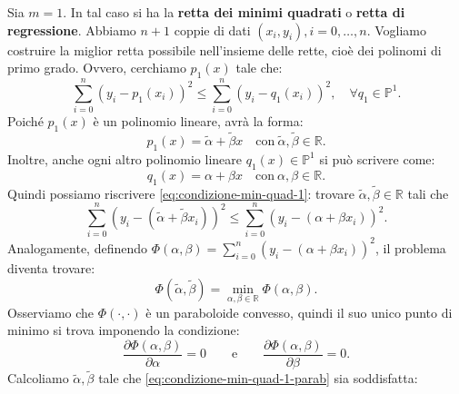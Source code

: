 Sia $m=1$. In tal caso si ha la \textbf{retta dei minimi quadrati} o \textbf{retta di regressione}. Abbiamo $n+1$ coppie di dati $( x_{i} ,y_{i}), i=0,\dotsc ,n$. Vogliamo costruire la miglior retta possibile nell'insieme delle rette, cioè dei polinomi di primo grado. Ovvero, cerchiamo $p_{1}(x)$ tale che:
\begin{equation}
\sum ^{n}_{i=0}( y_{i} -p_{1}( x_{i}))^{2} \leqslant \sum ^{n}_{i=0}( y_{i} -q_{1}( x_{i}))^{2} ,\quad\forall q_{1} \in \mathbb{P}^{1} .
\label{eq:condizione-min-quad-1}
\end{equation}
Poiché $p_{1}(x)$ è un polinomio lineare, avrà la forma:
\begin{equation*}
p_{1}(x) =\tilde{\alpha } +\tilde{\beta } x\quad\text{con} \ \tilde{\alpha } ,\tilde{\beta } \in \mathbb{R}.
\end{equation*}
Inoltre, anche ogni altro polinomio lineare $q_{1}(x) \in \mathbb{P}^{1}$ si può scrivere come:
\begin{equation*}
q_{1}(x) =\alpha +\beta x\quad\text{con} \ \alpha ,\beta \in \mathbb{R}.
\end{equation*}
Quindi possiamo riscrivere \eqref{eq:condizione-min-quad-1}: trovare $\tilde{\alpha } ,\tilde{\beta } \in \mathbb{R}$ tali che
\begin{equation*}
\sum ^{n}_{i=0}\left( y_{i} -\left(\tilde{\alpha } +\tilde{\beta } x_{i}\right)\right)^{2} \leqslant \sum ^{n}_{i=0}( y_{i} -( \alpha +\beta x_{i}))^{2}.
\end{equation*}
Analogamente, definendo $\Phi ( \alpha ,\beta ) =\sum ^{n}_{i=0}( y_{i} -( \alpha +\beta x_{i}))^{2}$, il problema diventa trovare:
\begin{equation*}
\Phi (\tilde{\alpha } ,\tilde{\beta }) =\min_{\alpha ,\beta \in \mathbb{R}} \Phi ( \alpha ,\beta ).
\end{equation*}
Osserviamo che $\Phi ( \cdot ,\cdot )$ è un paraboloide convesso, quindi il suo unico punto di minimo si trova imponendo la condizione:
\begin{equation}
\frac{\partial \Phi ( \alpha ,\beta )}{\partial \alpha } =0 \qquad \text{e} \qquad \frac{\partial \Phi ( \alpha ,\beta )}{\partial \beta } =0.
\label{eq:condizione-min-quad-1-parab}
\end{equation}
Calcoliamo $\tilde{\alpha } ,\tilde{\beta }$ tale che \eqref{eq:condizione-min-quad-1-parab} sia soddisfatta:
